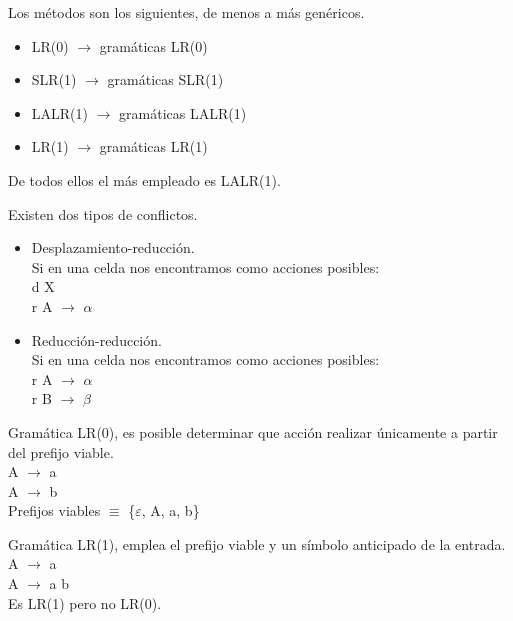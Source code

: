 \documentclass[\main/ApuntesPL.tex]{subfiles}
\begin{document}
      \bigskip
      \par
      Los métodos son los siguientes, de menos a más genéricos.
      \begin{itemize}
        \item LR(0) $\rightarrow$ gramáticas LR(0)
        \item SLR(1) $\rightarrow$ gramáticas SLR(1)
        \item LALR(1) $\rightarrow$ gramáticas LALR(1)
        \item LR(1) $\rightarrow$ gramáticas LR(1)
      \end{itemize}

      \par
      De todos ellos el más empleado es LALR(1).

      \bigskip
      \par
      Existen dos tipos de conflictos.
      \begin{itemize}
        \item Desplazamiento-reducción.\\
          Si en una celda nos encontramos como acciones posibles:\\
          \hspace{5mm}d X\\
          \hspace{5mm}r A $\rightarrow$ $\alpha$
        \item Reducción-reducción.\\
          Si en una celda nos encontramos como acciones posibles:\\
          \hspace{5mm}r A $\rightarrow$ $\alpha$\\
          \hspace{5mm}r B $\rightarrow$ $\beta$
      \end{itemize}

      \par
      Gramática LR(0), es posible determinar que acción realizar únicamente a
      partir del prefijo viable.\\
      \vspace{2mm}
      \hspace{10mm}A $\rightarrow$ a\\
      \hspace{10mm}A $\rightarrow$ b\\
      \hspace{10mm}Prefijos viables $\equiv$ \{$\varepsilon$, A, a, b\}

      \bigskip
      \par
      Gramática LR(1), emplea el prefijo viable y un símbolo anticipado de la
      entrada.\\
      \vspace{2mm}
      \hspace{10mm}A $\rightarrow$ a\\
      \hspace{10mm}A $\rightarrow$ a b\\
      \hspace{10mm}Es LR(1) pero no LR(0).
\end{document}
